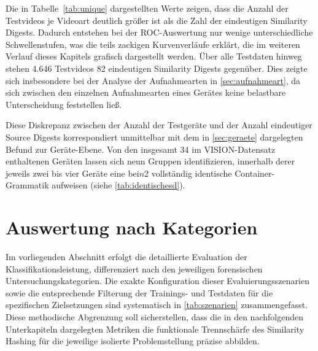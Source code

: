 Die in Tabelle~\ref{tab:unique} dargestellten Werte zeigen, dass die Anzahl der Testvideos je Videoart deutlich größer ist als die Zahl der eindeutigen Similarity Digests. Dadurch entstehen bei der ROC-Auswertung nur wenige unterschiedliche Schwellenstufen, was die teils zackigen Kurvenverläufe erklärt, die im weiteren Verlauf dieses Kapitels grafisch dargestellt werden. Über alle Testdaten hinweg stehen 4.646 Testvideos 82 eindeutigen Similarity Digests gegenüber. Dies zeigte sich insbesondere bei der Analyse der Aufnahmearten in \cref{sec:aufnahmeart}, da sich zwischen den einzelnen Aufnahmearten eines Gerätes keine belastbare Unterscheidung feststellen ließ.

Diese Diskrepanz zwischen der Anzahl der Testgeräte und der Anzahl eindeutiger Source Digests korrespondiert unmittelbar mit dem in \cref{sec:geraete} dargelegten Befund zur Geräte-Ebene. Von den insgesamt 34 im VISION-Datensatz enthaltenen Geräten lassen sich neun Gruppen identifizieren, innerhalb derer jeweils zwei bis vier Geräte eine bei\(n\)2 vollständig identische Container-Grammatik aufweisen (siehe \cref{tab:identischesd}).


\section{Auswertung nach Kategorien}
\label{sec:evalkategorien}

Im vorliegenden Abschnitt erfolgt die detaillierte Evaluation der Klassifikationsleistung, differenziert nach den jeweiligen forensischen Untersuchungskategorien. Die exakte Konfiguration dieser Evaluierungsszenarien sowie die entsprechende Filterung der Trainings- und Testdaten für die spezifischen Zielsetzungen sind systematisch in \cref{tab:szenarien} zusammengefasst. Diese methodische Abgrenzung soll sicherstellen, dass die in den nachfolgenden Unterkapiteln dargelegten Metriken die funktionale Trennschärfe des Similarity Hashing für die jeweilige isolierte Problemstellung präzise abbilden.

